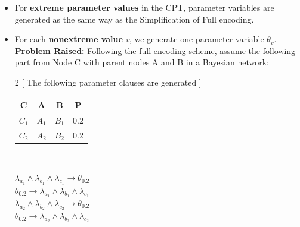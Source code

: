         \begin{itemize}
            \item For \textbf{extreme parameter values} in the CPT, parameter variables are generated as the same way as the Simplification of  Full encoding.
            \item For each \textbf{non\-extreme value} \textit{v}, we generate one parameter variable $\theta_{v}$.\\
        \textbf{Problem Raised:} Following the full encoding scheme, assume the following part from Node C with parent nodes A and B in a Bayesian network:
        \begin{multicols}{2}
        [
        The following parameter clauses are generated
        ]
        
        \begin{center}
        \vspace{10mm}
            \begin{tabular}{ c c c c } 
            \hline
            C & A & B & P\\
            \hline
            \hline
            $C_1$ & $A_1$ & $B_1$ & 0.2\\
            $C_2$ & $A_2$ & $B_2$ & 0.2\\
            \hline
            \end{tabular}\\ 
        \end{center} 
        \columnbreak
            
        $\lambda_{a_{1}} \wedge \lambda_{b_{1}} \wedge \lambda_{c_{1}} \rightarrow \theta_{0.2}$\\
        $ \theta_{0.2} \rightarrow \lambda_{a_{1}} \wedge \lambda_{b_{1}} \wedge \lambda_{c_{1}}$\\
        $\lambda_{a_{2}} \wedge \lambda_{b_{2}} \wedge \lambda_{c_{2}} \rightarrow \theta_{0.2}$\\
        $ \theta_{0.2} \rightarrow \lambda_{a_{2}} \wedge \lambda_{b_{2}} \wedge \lambda_{c_{2}}$\\
        \end{multicols}
        

\end{itemize}

